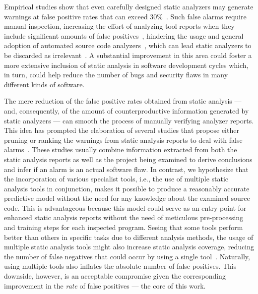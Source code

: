 Empirical studies show that even carefully designed static analyzers may
generate warnings at false positive rates that can exceed
30\%~\cite{kremenek2004correlation}. Such false alarms require manual
inspection, increasing the effort of analyzing tool reports when they include
significant amounts of false
positives~\cite{muske2013review,heckman2007adaptively}, hindering the usage and
general adoption of automated source code analyzers~\cite{johnson_why_2013},
which can lead static analyzers to be discarded as
irrelevant~\cite{kremenek2003z}.
A substantial improvement in this area could foster
a more extensive inclusion of static analysis in software development cycles which,
in turn, could help reduce the number of bugs and security flaws in many different
kinds of software.

The mere reduction of the false positive rates obtained from static analysis
--- and, consequently, of the amount of counterproductive information generated
by static analyzers --- can smooth the process of manually verifying analyzer
reports. This idea has prompted the elaboration of several studies that propose
either pruning or ranking the warnings from static analysis reports to deal
with false
alarms~\cite{ruthruff_predicting_2008,kremenek2004correlation,heckman2009model,jung2005taming}.
These studies usually combine information extracted from both the static
analysis reports as well as the project being examined to derive conclusions
and infer if an alarm is an actual software flaw. In contrast, we hypothesize
that the incorporation of various specialist tools, i.e., the use of multiple
static analysis tools in conjunction, makes it possible to produce a reasonably
accurate predictive model without the need for any knowledge about the examined
source code.  This is advantageous because this model could serve as an entry
point for enhanced static analysis reports without the need of meticulous
pre-processing and training steps for each inspected program. Seeing that some
tools perform better than others in specific tasks due to different analysis
methods, the usage of multiple static analysis tools might also increase static
analysis coverage, reducing the number of false negatives that could occur by
using a single tool~\cite{black2009static}. Naturally, using multiple tools
also inflates the absolute number of false positives. This downside, however,
is an acceptable compromise given the corresponding improvement in the
\emph{rate} of false positives --- the core of this work.

